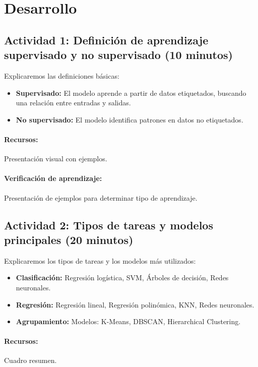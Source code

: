 \documentclass[a4,11pt]{aleph-notas}
\begin{document}
\section*{Desarrollo}

\subsection*{Actividad 1: Definición de aprendizaje supervisado y no supervisado (10 minutos)}  
Explicaremos las definiciones básicas:
\begin{itemize}
    \item \textbf{Supervisado:} El modelo aprende a partir de datos etiquetados, buscando una relación entre entradas y salidas. 
    \item \textbf{No supervisado:} El modelo identifica patrones en datos no etiquetados. 
\end{itemize}

\paragraph{Recursos:} Presentación visual con ejemplos.  

\paragraph{Verificación de aprendizaje:} Presentación de ejemplos para determinar tipo de aprendizaje.

\subsection*{Actividad 2: Tipos de tareas y modelos principales  (20 minutos)}  
Explicaremos los tipos de tareas y los modelos más utilizados:
\begin{itemize}
    \item \textbf{Clasificación:} Regresión logística, SVM, Árboles de decisión, Redes neuronales.
    \item \textbf{Regresión:} Regresión lineal, Regresión polinómica, KNN, Redes neuronales.
    \item \textbf{Agrupamiento:} Modelos: K-Means, DBSCAN, Hierarchical Clustering.
\end{itemize}

\paragraph{Recursos:} Cuadro resumen.  
\end{document}
